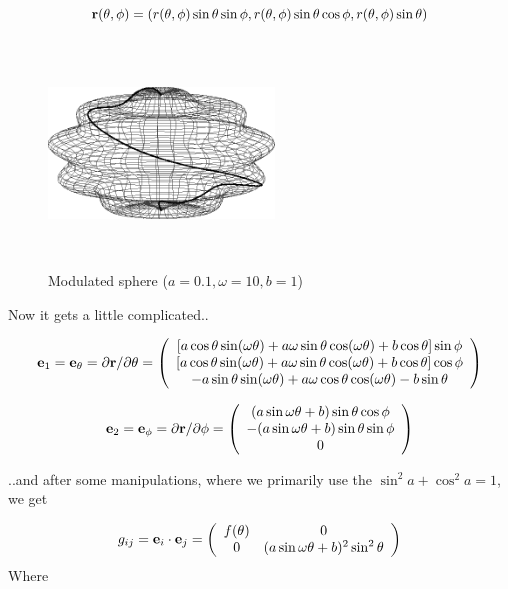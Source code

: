 \newcommand{\rtp}{r(\theta,\phi)}
$$
  \vec{r}(\theta,\phi) = (\rtp\stsp, \rtp\stcp, \rtp\st)
$$

\begin{figure}[!ht]
  \begin{center}
    \includegraphics[width=6cm,height=6cm]{figures/def_sph_wind}
  \end{center}

  \caption{\small Modulated sphere ($a=0.1, \omega=10, b=1$)}
  \label{fig-def_sph_wind}
\end{figure}

Now it gets a little complicated..

$$
    \mathbf{e}_1=\mathbf{e}_\theta=\partial\mathbf{r}/\partial\theta = 
        \left( \begin{array}{c}
          \left[a\cos\theta\sin(\omega\theta)+a\omega\sin\theta\cos(\omega\theta)+b\cos\theta\right] \sin\phi \\ 
          \left[a\cos\theta\sin(\omega\theta)+a\omega\sin\theta\cos(\omega\theta)+b\cos\theta\right] \cos\phi \\ 
               -a\sin\theta\sin(\omega\theta)+a\omega\cos\theta\cos(\omega\theta)-b\sin\theta
        \end{array} \right)
$$

$$
    \mathbf{e}_2=\mathbf{e}_\phi=\partial\mathbf{r}/\partial\phi = 
        \left( \begin{array}{c}
         (a\sin\omega\theta + b)\sin\theta\cos\phi\\ 
         - (a\sin\omega\theta + b)\sin\theta\sin\phi\\ 
            0
        \end{array} \right)
$$

..and after some manipulations, where we primarily use the  \mbox{$\sin^2a + \cos^2a = 1$}, we get 


$$
    g_{ij} = \mathbf{e}_i\cdot\mathbf{e}_j = \left( \begin{array}{ccc}
      f(\theta) & 0 \\
      0  & (a\sin\omega\theta + b)^2\sin^2\theta 
    \end{array} \right)
$$
Where

